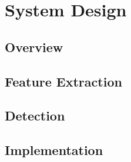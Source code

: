 \chapter{System Design}

\section{Overview}

\section{Feature Extraction}

\section{Detection}

\section{Implementation}

